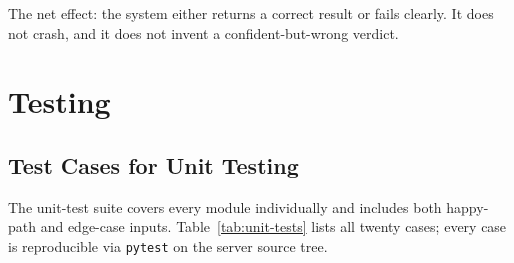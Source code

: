 \documentclass[12pt,a4paper]{report}
\begin{document}
The net effect: the system either returns a correct result or fails clearly. It does not crash, and it does not invent a confident-but-wrong verdict.

\section{Testing}

\subsection{Test Cases for Unit Testing}

The unit-test suite covers every module individually and includes both happy-path and edge-case inputs. Table~\ref{tab:unit-tests} lists all twenty cases; every case is reproducible via \texttt{pytest} on the server source tree.
\end{document}
